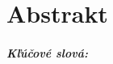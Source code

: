 \documentclass[12pt, oneside]{book}  %
\begin{document}
\thispagestyle{empty}

\newpage 
\thispagestyle{empty}
\chapter*{Abstrakt}\label{chap:abstract_sk}


\paragraph*{Kľúčové slová: }
\thispagestyle{empty}
\newpage



\tableofcontents
\thispagestyle{empty}
\newpage

\mainmatter





\appendix
\newpage
\renewcommand{\thepage}{}
\nocite{*}
\printbibliography
\end{document}
